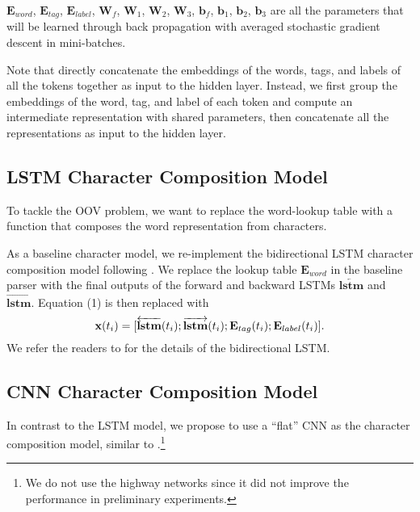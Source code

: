 \documentclass[11pt,a4paper]{article}
\begin{document}
    $\mathbf{E}_{word}$, $\mathbf{E}_{tag}$, $\mathbf{E}_{label}$, $\mathbf{W}_f$, $\mathbf{W}_1$, $\mathbf{W}_2$, $\mathbf{W}_3$, $\mathbf{b}_f$, $\mathbf{b}_1$, $\mathbf{b}_2$, $\mathbf{b}_3$ are all the parameters that will be learned through back propagation with averaged stochastic gradient descent in mini-batches.

    Note that \citet{Weiss:2015} directly concatenate the embeddings of the words, tags, and labels of all the tokens together as input to the hidden layer. Instead, we first group the embeddings of the word, tag, and label of each token and compute an intermediate representation with shared parameters, then concatenate all the representations as input to the hidden layer. 


  \subsection{LSTM Character Composition Model}
    To tackle the OOV problem, we want to replace the word-lookup table with a function that composes the word representation from characters. 

    As a baseline character model, we re-implement the bidirectional LSTM character composition model following \citet{Ballesteros:2015}. We replace the lookup table $\mathbf{E}_{word}$ in the baseline parser with the final outputs of the forward and backward LSTMs $\overleftarrow{\mathbf{lstm}}$ and $\overrightarrow{\mathbf{lstm}}$.
    Equation (1) is then replaced with
    \begin{equation*}
    \mathbf{x}(t_i) = [\overleftarrow{\mathbf{lstm}}(t_i); \overrightarrow{\mathbf{lstm}}(t_i); \mathbf{E}_{tag}(t_i); \mathbf{E}_{label}(t_i)] .\\
    \end{equation*} 
    We refer the readers to \citet{Ling:2015} for the details of the bidirectional LSTM. 


  \subsection{CNN Character Composition Model}
    In contrast to the LSTM model, we propose to use a ``flat'' CNN as the character composition model, similar to \citet{Kim:2016}.\footnote{We do not use the highway networks since it did not improve the performance in preliminary experiments.}
\end{document}
